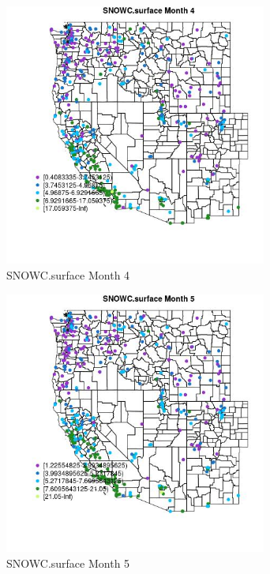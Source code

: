 \begin{figure} 
\centering  
\includegraphics[width=0.77\textwidth]{Code_Outputs/ML_input_report_ML_input_PM25_Step5_part_d_de_duplicated_aves_ML_input_MapObsMo4SNOWCsurface.jpg} 
\caption{\label{fig:ML_input_report_ML_input_PM25_Step5_part_d_de_duplicated_aves_ML_inputMapObsMo4SNOWCsurface}SNOWC.surface Month 4} 
\end{figure} 
 

\begin{figure} 
\centering  
\includegraphics[width=0.77\textwidth]{Code_Outputs/ML_input_report_ML_input_PM25_Step5_part_d_de_duplicated_aves_ML_input_MapObsMo5SNOWCsurface.jpg} 
\caption{\label{fig:ML_input_report_ML_input_PM25_Step5_part_d_de_duplicated_aves_ML_inputMapObsMo5SNOWCsurface}SNOWC.surface Month 5} 
\end{figure} 
 

